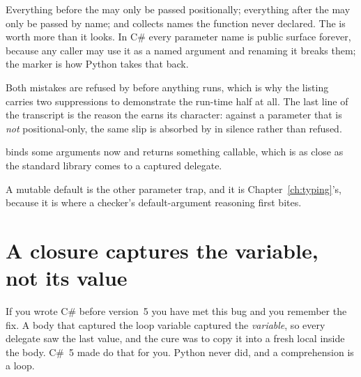 \noindent
Everything before the \code{/} may only be passed positionally; everything
after the \code{*} may only be passed by name; and 
collects names the function never declared. The \code{/} is worth more than
it looks. In C\# every parameter name is public surface forever, because
any caller may use it as a named argument and renaming it breaks them; the
marker is how Python takes that back.



\begin{note}
Both mistakes are refused by  before anything runs, which is
why the listing carries two suppressions to demonstrate the run-time half
at all. The last line of the transcript is the reason the \code{/} earns
its character: against a parameter that is \emph{not} positional-only, the
same slip is absorbed by  in silence rather than refused.
\end{note}

 binds some arguments now and returns something
callable, which is as close as the standard library comes to a captured
delegate.


\noindent
A mutable default \dash{}  \dash{} is the other
parameter trap, and it is Chapter~\ref{ch:typing}'s, because it is where a
checker's default-argument reasoning first bites.

\section{A closure captures the variable, not its value}
\label{sec:ch05-closures}

If you wrote C\# before version~5 you have met this bug and you remember
the fix. A  body that captured the loop variable captured the
\emph{variable}, so every delegate saw the last value, and the cure was to
copy it into a fresh local inside the body. C\#~5 made  do
that for you. Python never did, and a comprehension is a loop.


